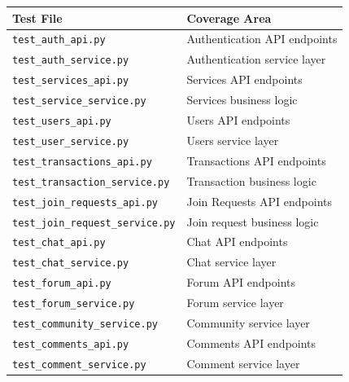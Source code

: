 \documentclass[10pt,a4paper]{report}
\begin{document}
\begin{table}[h]
    \centering
    \begin{tabular}{|l|l|}
        \hline
        \textbf{Test File}                     & \textbf{Coverage Area}           \\
        \hline
        \texttt{test\_auth\_api.py}            & Authentication API endpoints     \\
        \hline
        \texttt{test\_auth\_service.py}        & Authentication service layer     \\
        \hline
        \texttt{test\_services\_api.py}        & Services API endpoints           \\
        \hline
        \texttt{test\_service\_service.py}     & Services business logic          \\
        \hline
        \texttt{test\_users\_api.py}           & Users API endpoints              \\
        \hline
        \texttt{test\_user\_service.py}        & Users service layer              \\
        \hline
        \texttt{test\_transactions\_api.py}    & Transactions API endpoints       \\
        \hline
        \texttt{test\_transaction\_service.py} & Transaction business logic       \\
        \hline
        \texttt{test\_join\_requests\_api.py}  & Join Requests API endpoints      \\
        \hline
        \texttt{test\_join\_request\_service.py} & Join request business logic    \\
        \hline
        \texttt{test\_chat\_api.py}            & Chat API endpoints               \\
        \hline
        \texttt{test\_chat\_service.py}        & Chat service layer               \\
        \hline
        \texttt{test\_forum\_api.py}           & Forum API endpoints              \\
        \hline
        \texttt{test\_forum\_service.py}       & Forum service layer              \\
        \hline
        \texttt{test\_community\_service.py}   & Community service layer          \\
        \hline
        \texttt{test\_comments\_api.py}        & Comments API endpoints           \\
        \hline
        \texttt{test\_comment\_service.py}     & Comment service layer            \\

\end{tabular}
\end{table}
\end{document}
